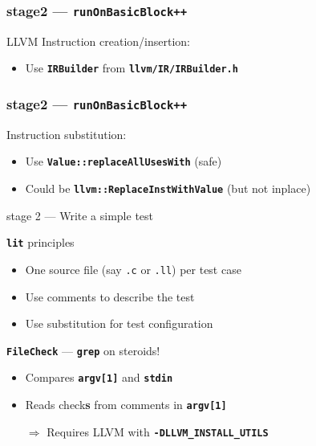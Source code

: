 \documentclass[14pt]{beamer}
\newcommand{\Command}[1]{\textbf{\texttt{#1}}}
\newcommand{\Code}[1]{\textbf{\texttt{#1}}}
\begin{document}
    \begin{frame}[containsverbatim]
    \frametitle{stage2 --- \texttt{runOnBasicBlock++}}
    LLVM Instruction creation/insertion:
    \begin{itemize}
        \item Use \Code{IRBuilder} from \Code{llvm/IR/IRBuilder.h}
    \end{itemize}
    \hspace{-5em}%
    \begin{minipage}{\textwidth}
        \scriptsize
        
    \end{minipage}
    \end{frame}

    \begin{frame}[containsverbatim]
    \frametitle{stage2 --- \texttt{runOnBasicBlock++}}
    Instruction substitution:
    \begin{itemize}
        \item Use \Code{Value::replaceAllUsesWith} (safe)
        \item Could be \Code{llvm::ReplaceInstWithValue} (but not inplace)
    \end{itemize}
    \hspace{-5em}%
    \begin{minipage}{\textwidth}
        \footnotesize
        
    \end{minipage}
    \end{frame}

    \begin{frame}{stage 2 --- Write a simple test}
        \begin{alertblock}{\Command{lit} principles}
            \begin{itemize}
                \item One source file (say \texttt{.c} or \texttt{.ll}) per test case
                \item Use comments to describe the test
                \item Use substitution for test configuration
            \end{itemize}
        \end{alertblock}

        \begin{block}{\Command{FileCheck} --- \Command{grep} on steroids!}
            \begin{itemize}
                \item Compares \Code{argv[1]} and \Code{stdin}
                \item Reads check\textbf{s} from comments in \Code{argv[1]}
                \item[$\Rightarrow$] Requires LLVM with \Code{-DLLVM\_INSTALL\_UTILS}
            \end{itemize}
        \end{block}
    \end{frame}
\end{document}
